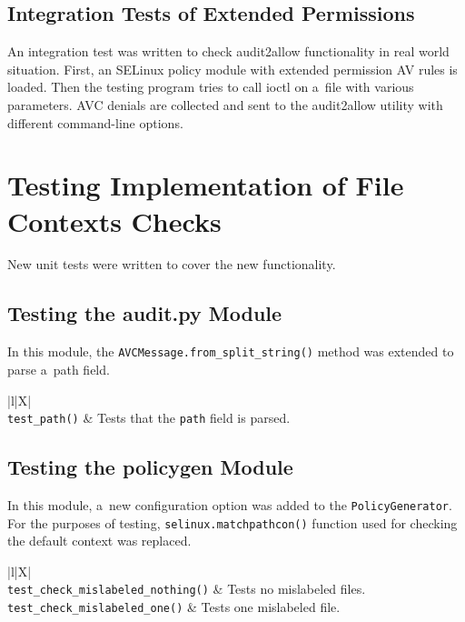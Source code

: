 \subsection{Integration Tests of Extended Permissions}

An integration test was written to check audit2allow functionality in real world
situation. First, an SELinux policy module with extended permission AV rules is
loaded. Then the testing program tries to call ioctl on a~file with various
parameters. AVC denials are collected and sent to the audit2allow utility with
different command-line options.

\section{Testing Implementation of File Contexts Checks}
New unit tests were written to cover the new functionality.

\subsection{Testing the audit.py Module}
In this module, the \texttt{AVCMessage.from\_split\_string()} method was
extended to parse a~path field.
\begin{longtabu}{|l|X|} \hline \endfirsthead
    \\ \hline
    \texttt{test\_path()} & Tests that the \texttt{path} field is parsed.
    \\ \hline
\end{longtabu}

\subsection{Testing the policygen Module}
In this module, a~new configuration option was added to the
\texttt{PolicyGenerator}. For the purposes of testing,
\texttt{selinux.matchpathcon()} function used for checking the default context
was replaced. 
\pagebreak
\begin{longtabu}{|l|X|} \hline \endfirsthead
    \\ \hline
    \texttt{test\_check\_mislabeled\_nothing()} & Tests no mislabeled files.
    \\ \hline
    \texttt{test\_check\_mislabeled\_one()} & Tests one mislabeled file.
    \\ \hline
\end{longtabu}

